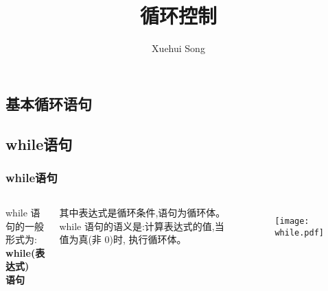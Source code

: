 \documentclass[cjk,slidestop,mathserif,hyperref={CJKbookmarks=true}]{beamer}
\begin{document}
\begin{CJK*}{UTF8}{gkai}

\title{循环控制}	%
\author{Xuehui Song}	%

\frame{\titlepage}
 
\frame{\tableofcontents}


\section{基本循环语句}
\subsection{while语句}
\begin{frame}[fragile]
    \frametitle{while语句}
    \begin{columns}
        \column{6cm}
            \begin{definition}
                while 语句的一般形式为:\\
                \quad\textbf{while(表达式)\\ \qquad 语句}
            \end{definition}
            其中表达式是循环条件,语句为循环体。
            while 语句的语义是:计算表达式的值,当值为真(非 0)时, 执行循环体。
        \column{5cm}
            \begin{figure}
                \texttt{[image: while.pdf]}
            \end{figure}



\end{columns}
\end{frame}
\end{CJK*}
\end{document}
